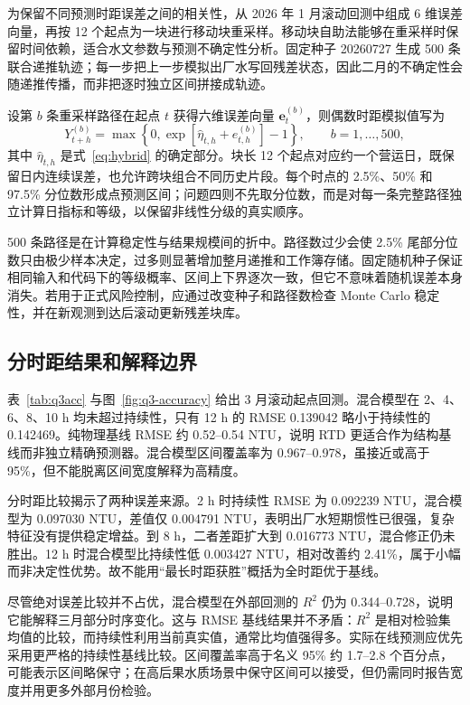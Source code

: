 \documentclass[UTF8,12pt,a4paper]{ctexart}
\newcommand{\Rtwo}{R^{2}}
\begin{document}
为保留不同预测时距误差之间的相关性，从 2026 年 1 月滚动回测中组成 6 维误差向量，再按 12 个起点为一块进行移动块重采样。移动块自助法能够在重采样时保留时间依赖，适合水文参数与预测不确定性分析\cite{ebtehaj2010}。固定种子 20260727 生成 500 条联合递推轨迹；每一步把上一步模拟出厂水写回残差状态，因此二月的不确定性会随递推传播，而非把逐时独立区间拼接成轨迹。

设第 $b$ 条重采样路径在起点 $t$ 获得六维误差向量 $\boldsymbol e_t^{(b)}$，则偶数时距模拟值写为
\begin{equation}
Y_{t+h}^{(b)}=\max\left\{0,
\exp\left[\widehat\eta_{t,h}+e_{t,h}^{(b)}\right]-1\right\},
\qquad b=1,\ldots,500,
\label{eq:path}
\end{equation}
其中 $\widehat\eta_{t,h}$ 是式~\eqref{eq:hybrid} 的确定部分。块长 12 个起点对应约一个营运日，既保留日内连续误差，也允许跨块组合不同历史片段。每个时点的 2.5\%、50\% 和 97.5\% 分位数形成点预测区间；问题四则不先取分位数，而是对每一条完整路径独立计算日指标和等级，以保留非线性分级的真实顺序。

500 条路径是在计算稳定性与结果规模间的折中。路径数过少会使 2.5\% 尾部分位数只由极少样本决定，过多则显著增加整月递推和工作簿存储。固定随机种子保证相同输入和代码下的等级概率、区间上下界逐次一致，但它不意味着随机误差本身消失。若用于正式风险控制，应通过改变种子和路径数检查 Monte Carlo 稳定性，并在新观测到达后滚动更新残差块库。

\subsection{分时距结果和解释边界}

表~\ref{tab:q3acc} 与图~\ref{fig:q3-accuracy} 给出 3 月滚动起点回测。混合模型在 2、4、6、8、10 h 均未超过持续性，只有 12 h 的 RMSE 0.139042 略小于持续性的 0.142469。纯物理基线 RMSE 约 0.52--0.54 NTU，说明 RTD 更适合作为结构基线而非独立精确预测器。混合模型区间覆盖率为 0.967--0.978，虽接近或高于 95\%，但不能脱离区间宽度解释为高精度。

分时距比较揭示了两种误差来源。2 h 时持续性 RMSE 为 0.092239 NTU，混合模型为 0.097030 NTU，差值仅 0.004791 NTU，表明出厂水短期惯性已很强，复杂特征没有提供稳定增益。到 8 h，二者差距扩大到 0.016773 NTU，混合修正仍未胜出。12 h 时混合模型比持续性低 0.003427 NTU，相对改善约 2.41\%，属于小幅而非决定性优势。故不能用“最长时距获胜”概括为全时距优于基线。

尽管绝对误差比较并不占优，混合模型在外部回测的 $\Rtwo$ 仍为 0.344--0.728，说明它能解释三月部分时序变化。这与 RMSE 基线结果并不矛盾：$\Rtwo$ 是相对检验集均值的比较，而持续性利用当前真实值，通常比均值强得多。实际在线预测应优先采用更严格的持续性基线比较。区间覆盖率高于名义 95\% 约 1.7--2.8 个百分点，可能表示区间略保守；在高后果水质场景中保守区间可以接受，但仍需同时报告宽度并用更多外部月份检验。
\end{document}
